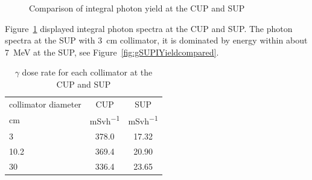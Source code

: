 \documentclass[12pt,journal]{IEEEtran}
\let\MYoriglatexcaption\caption
\renewcommand{\caption}[2][\relax]{\MYoriglatexcaption[#2]{#2}}
\begin{document}
\begin{figure}[!t] 
	\centering    
	\vfil
	\caption{Comparison of integral photon yield at the CUP and SUP}
	\label{fig:gIYieldspectra}
\end{figure}
Figure~\ref{fig:gIYieldspectra} displayed integral photon spectra at the CUP and SUP. The photon spectra at the SUP with \SI{3}{\cm} collimator, it is dominated by energy within about \SI{7}{\MeV} at the SUP, see Figure~\ref{fig:gSUPIYieldcompared}.

\begin{table}
\caption{$\gamma$ dose rate for each collimator at the CUP and SUP}	%
\centering
\label{Table:DoseRate}
        \begin{tabular}{l c c}
            \toprule
            {collimator diameter}   &{CUP}         &{SUP}\\
            {\si{\centi\metre}}    &{\si{mSvh^{-1}}}   &{\si{mSvh^{-1}}}\\
            \midrule
            3                       & 378.0                	& 17.32\\
            10.2                  & 369.4               	& 20.90\\
            30                     & 336.4          		& 23.65\\
            \bottomrule
\end{tabular}
\end{table}
\end{document}
